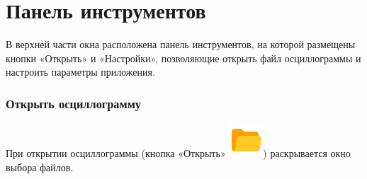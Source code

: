 \documentclass[a4paper,12pt]{article}
\begin{document}
 
\section*{\hspace{.5cm}Панель инструментов } 
\hspace{.5cm}В верхней части окна расположена панель инструментов, на которой размещены кнопки «Открыть» и «Настройки», позволяющие открыть файл осциллограммы и настроить параметры приложения. 
\subsubsection*{\hspace{.5cm} Открыть осциллограмму} 
\hspace{.5cm} При открытии осциллограммы (кнопка «Открыть» \includegraphics[width=4ex]{image/OpenFolder.png}) раскрывается окно выбора файлов. 
\end{document}
